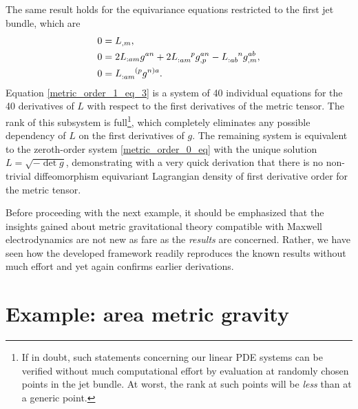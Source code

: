 The same result holds for the equivariance equations restricted to the first jet bundle, which are
\begin{subequations}
  \begin{align}
    0 &{} = L_{,m}, \label{metric_order_1_eq_1}\\
    0 &{} = 2 L_{:am}g^{an} + 2 L_{:am}^{\hphantom{:am}p}g^{an}_{,p} - L_{:ab}^{\hphantom{:ab}n}g^{ab}_{,m}, \label{metric_order_1_eq_2}\\
    0 &{} = L_{:am}^{\hphantom{:am}(p}g^{n)a}. \label{metric_order_1_eq_3}
  \end{align}
\end{subequations}
Equation \ref{metric_order_1_eq_3} is a system of 40 individual equations for the 40 derivatives of $L$ with respect to the first derivatives of the metric tensor. The rank of this subsystem is full\footnote{If in doubt, such statements concerning our linear PDE systems can be verified without much computational effort by evaluation at randomly chosen points in the jet bundle. At worst, the rank at such points will be \emph{less} than at a generic point.}, which completely eliminates any possible dependency of $L$ on the first derivatives of $g$. The remaining system is equivalent to the zeroth-order system \eqref{metric_order_0_eq} with the unique solution $L=\sqrt{-\operatorname{det}g}$, demonstrating with a very quick derivation that there is no non-trivial diffeomorphism equivariant Lagrangian density of first derivative order for the metric tensor.

Before proceeding with the next example, it should be emphasized that the insights gained about metric gravitational theory compatible with Maxwell electrodynamics are not new as fare as the \emph{results} are concerned. Rather, we have seen how the developed framework readily reproduces the known results without much effort and yet again confirms earlier derivations.

\section{Example: area metric gravity}
\label{section_gled}

